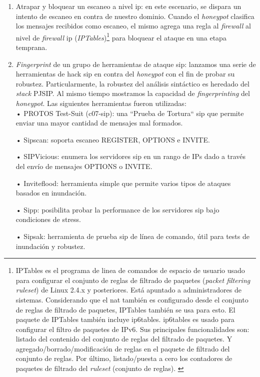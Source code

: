 \documentclass[a4paper,12pt]{report}
\begin{document}
\begin{itemize}
\begin{enumerate}
\item Atrapar y bloquear un escaneo a nivel \ac{ip}:
en este escenario, se dispara un intento de escaneo en contra de nuestro
dominio. Cuando el \emph{honeypot} clasifica los mensajes recibidos como escaneo, el
mismo agrega una regla al \emph{firewall} al nivel de \emph{firewall} \ac{ip}
(\emph{IPTables})\footnote{IPTables es el programa de linea de comandos de
espacio de usuario usado para configurar el conjunto de reglas de filtrado de
paquetes (\emph{packet filtering ruleset}) de Linux 2.4.x y posteriores. Está
apuntado a administradores de sistemas. Considerando que el \ac{nat} también
es configurado desde el conjunto de reglas de
filtrado de paquetes, IPTables también se usa para esto. El paquete de IPTables
también incluye ip6tables. ip6tables es usado para configurar el filtro
de paquetes de IPv6. Sus principales funcionalidades son: listado del
contenido del conjunto de reglas del filtrado de paquetes. Y
agregado/borrado/modificación de reglas en el paquete de filtrado del conjunto
de reglas. Por último, listado/puesta a cero los contadores de paquetes de
filtrado del \emph{ruleset} (conjunto de reglas). \cite{netfilterneira}} para bloquear el ataque en
una etapa temprana. 

                                                                 
\item \emph{Fingerprint} de un grupo de herramientas de ataque \ac{sip}: lanzamos una serie de
herramientas de hack \ac{sip} en contra del \emph{honeypot} con el fin de probar su
robustez. Particularmente, la robustez del análisis sintáctico es heredado del
\emph{stack} PJSIP. Al mismo tiempo mostramos la capacidad de \emph{fingerprinting}
del \emph{honeypot}. Las si\-gui\-en\-tes herramientas fueron utilizadas:\\

• PROTOS Test-Suit (c07-\ac{sip}): una ``Prueba de Tortura`` \ac{sip} que permite enviar
una mayor cantidad de mensajes mal formados.

• Sipscan: soporta escaneo REGISTER, OPTIONS e INVITE.

• SIPVicious: enumera los servidores \ac{sip} en un rango de IPs dado a través del
envío de mensajes OPTIONS o INVITE.

• Inviteflood: herramienta simple que permite varios tipos de ataques basados
en inundación.

• Sipp: posibilita probar la performance de los servidores \ac{sip} bajo condiciones
de stress.

• Sipsak: herramienta de prueba \ac{sip} de línea de comando, útil para tests de
inundación y robustez.


\end{enumerate}
\end{itemize}
\end{document}
